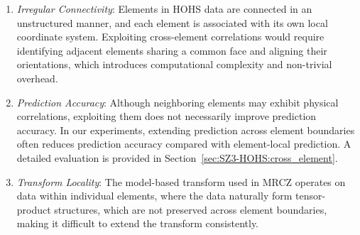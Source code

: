 \begin{enumerate}
\item \textit{Irregular Connectivity}: Elements in HOHS data are connected in an unstructured manner, and each element is associated with its own local coordinate system. Exploiting cross-element correlations would require identifying adjacent elements sharing a common face and aligning their orientations, which introduces computational complexity and non-trivial overhead.
\item \textit{Prediction Accuracy}: Although neighboring elements may exhibit physical correlations, exploiting them does not necessarily improve prediction accuracy. In our experiments, extending prediction across element boundaries often reduces prediction accuracy compared with element-local prediction. A detailed evaluation is provided in Section~\ref{sec:SZ3-HOHS:cross_element}.
\item \textit{Transform Locality}: The model-based transform used in MRCZ operates on data within individual elements, where the data naturally form tensor-product structures, which are not preserved across element boundaries, making it difficult to extend the transform consistently.
\end{enumerate}

